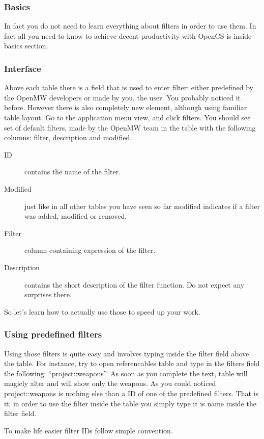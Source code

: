 \subsubsection{Basics}
In fact you do not need to learn everything about filters in order to use them. In fact all you need to know to achieve decent productivity
with OpenCS is inside basics section.

\subsubsection{Interface}
Above each table there is a field that is used to enter filter: either predefined by the OpenMW developers or made by you, the user.
You probably noticed it before. However there is also completely new element, although using familiar table layout. Go to the application
menu view, and click filters. You should see set of default filters, made by the OpenMW team in the table with the following columns: filter,
description and modified.

\begin{description}
 \item[ID] contains the name of the filter.
 \item[Modified] just like in all other tables you have seen so far modified indicates if a filter was added, modified or removed.
 \item[Filter] column containing expression of the filter.
 \item[Description] contains the short description of the filter function. Do not expect any surprises there.
\end{description}

So let's learn how to actually use those to speed up your work.
\subsubsection{Using predefined filters}
Using those filters is quite easy and involves typing inside the filter field above the table. For instance, try to open referencables
table and type in the filters field the following: ``project::weapons''. As soon as you complete the text, table will magicly alter
and will show only the weapons. As you could noticed project::weapons is nothing else than a ID of one of the predefined filters. That is it:
in order to use the filter inside the table you simply type it is name inside the filter field.

To make life easier filter IDs follow simple convention. 

